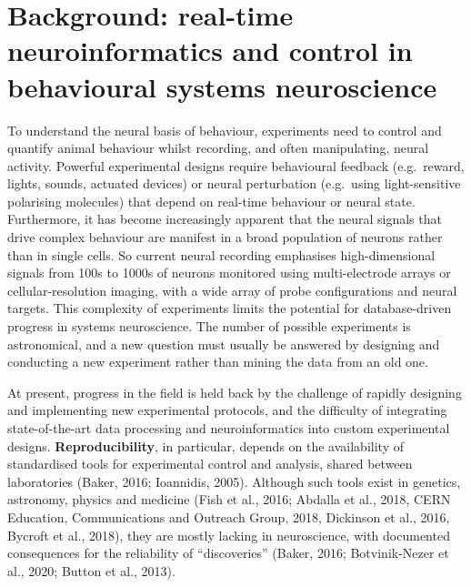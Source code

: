 \section{Background: real-time neuroinformatics and control in behavioural systems
  neuroscience}

To understand the neural basis of behaviour, experiments need to control and quantify animal behaviour whilst recording, and often manipulating, neural activity. 
%
Powerful experimental designs require behavioural feedback (e.g.\ reward, lights, sounds, actuated
devices) or neural perturbation (e.g.\ using light-sensitive polarising
molecules) that depend on real-time behaviour or neural state.
%
Furthermore, it has become increasingly apparent that the neural signals that
drive complex behaviour are manifest in a broad population of neurons rather
than in single cells.  So current neural recording emphasises high-dimensional
signals from 100s to 1000s of neurons monitored using multi-electrode arrays or cellular-resolution imaging, with a wide array of probe configurations and neural targets.
%
This complexity of experiments limits the potential for database-driven progress in systems neuroscience.
%
The number of possible experiments is astronomical, and a new question must
usually be answered by designing and conducting a new experiment rather than
mining the data from an old one.

At present, progress in the field is held back by the challenge of rapidly designing and implementing new experimental protocols, and the difficulty of integrating state-of-the-art data processing and
neuroinformatics into custom experimental designs.
%
\textbf{Reproducibility}, in particular, depends on the availability of standardised tools for experimental control and analysis, shared between laboratories (Baker, 2016; Ioannidis, 2005). Although such tools exist in genetics, astronomy, physics and medicine (Fish et al., 2016; Abdalla et al., 2018, CERN Education, Communications and Outreach Group, 2018, Dickinson et al., 2016, Bycroft et al., 2018), they are mostly lacking in neuroscience, with documented consequences for the reliability of ``discoveries'' (Baker, 2016; Botvinik-Nezer et al., 2020; Button et al., 2013). 

